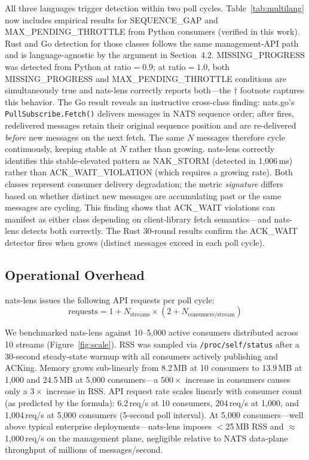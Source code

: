 \documentclass[sigconf,nonacm]{acmart}
\begin{document}
All three languages trigger detection within two poll cycles.
Table~\ref{tab:multilang} now includes empirical results for
SEQUENCE\_GAP and MAX\_PENDING\_\allowbreak THROTTLE from Python
consumers (verified in this work). Rust and Go detection for those
classes follows the same management-API path and is language-agnostic
by the argument in Section~4.2.
MISSING\_\allowbreak PROGRESS was detected from Python at ratio$=0.9$;
at ratio$=1.0$, both MISSING\_\allowbreak PROGRESS and
MAX\_PENDING\_\allowbreak THROTTLE conditions are simultaneously true
and nats-lens correctly reports both---the $\dagger$ footnote captures
this behavior.
The Go result reveals an instructive cross-class finding: nats.go's
\texttt{PullSubscribe.Fetch()} delivers messages in NATS sequence order;
after  fires, redelivered messages retain their original
sequence position and are re-delivered \emph{before} new messages on
the next fetch. The same $N$ messages therefore cycle continuously,
keeping  stable at $N$ rather than growing.
nats-lens correctly identifies this stable-elevated pattern as
NAK\_STORM (detected in 1{,}006\,ms) rather than ACK\_WAIT\_\allowbreak VIOLATION
(which requires a growing rate). Both classes represent consumer delivery
degradation; the metric \emph{signature} differs based on whether distinct
new messages are accumulating past  or the same messages
are cycling. This finding shows that ACK\_WAIT violations can manifest
as either class depending on client-library fetch semantics---and
nats-lens detects both correctly. The Rust 30-round results confirm the
ACK\_WAIT detector fires when  grows (distinct
messages exceed  in each poll cycle).

\subsection{Operational Overhead}

nats-lens issues the following API requests per poll cycle:
\[
\text{requests} = 1 + N_\text{streams} \times (2 + N_\text{consumers/stream})
\]

We benchmarked nats-lens against 10--5{,}000 active consumers distributed
across 10 streams (Figure~\ref{fig:scale}). RSS was sampled via
\texttt{/proc/self/status} after a 30-second steady-state warmup with all
consumers actively publishing and ACKing.
Memory grows sub-linearly from 8.2\,MB at 10 consumers to
13.9\,MB at 1{,}000 and 24.5\,MB at 5{,}000 consumers---a
$500\times$ increase in consumers causes only a $3\times$ increase in RSS.
API request rate scales linearly with consumer count (as predicted by the
formula): 6.2\,req/s at 10 consumers, 204\,req/s at 1{,}000, and
1{,}004\,req/s at 5{,}000 consumers (5-second poll interval).
At 5{,}000 consumers---well above typical enterprise deployments---nats-lens
imposes $<$25\,MB RSS and $\approx$1{,}000\,req/s on the management plane,
negligible relative to NATS data-plane throughput of millions of
messages/second.
\end{document}
